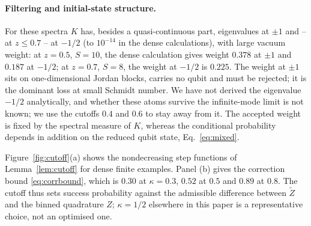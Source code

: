 \documentclass[11pt,a4paper]{article}
\newcommand{\Zt}{\widetilde Z}
\begin{document}
\paragraph{Filtering and initial-state structure.}
For these spectra $K$ has, besides a quasi-continuous part, eigenvalues at $\pm1$ and -- at $z\le0.7$ -- at $-1/2$ (to $10^{-14}$ in the dense calculations), with large vacuum weight: at $z=0.5$, $S=10$, the dense calculation gives weight $0.378$ at $\pm1$ and $0.187$ at $-1/2$; at $z=0.7$, $S=8$, the weight at $-1/2$ is $0.225$. The weight at $\pm1$ sits on one-dimensional Jordan blocks, carries no qubit and must be rejected; it is the dominant loss at small Schmidt number. We have not derived the eigenvalue $-1/2$ analytically, and whether these atoms survive the infinite-mode limit is not known; we use the cutoffs $0.4$ and $0.6$ to stay away from it. The accepted weight is fixed by the spectral measure of $K$, whereas the conditional probability depends in addition on the reduced qubit state, Eq.~\eqref{eq:mixed}.

Figure~\ref{fig:cutoff}(a) shows the nondecreasing step functions of Lemma~\ref{lem:cutoff} for dense finite examples. Panel (b) gives the correction bound \eqref{eq:corrbound}, which is $0.30$ at $\kappa=0.3$, $0.52$ at $0.5$ and $0.89$ at $0.8$. The cutoff thus sets success probability against the admissible difference between $\Zt$ and the binned quadrature $Z$; $\kappa=1/2$ elsewhere in this paper is a representative choice, not an optimised one.
\end{document}
